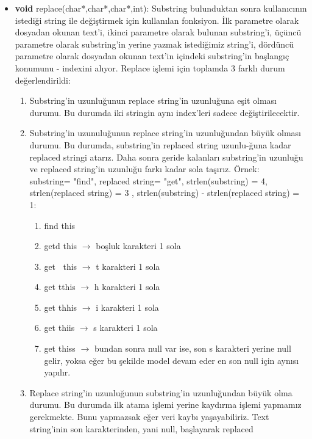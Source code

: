\documentclass[11pt]{article}
\begin{document}
\begin{itemize}
    \item \textbf{void} \textsf{replace(char*,char*,char*,int):}
    Substring bulunduktan sonra kullanıcının istediği string ile değiştirmek 
    için kullanılan fonksiyon. İlk parametre olarak dosyadan okunan text'i,
    ikinci parametre olarak bulunan substring'i, üçüncü parametre olarak 
    substring'in yerine yazmak istediğimiz string'i, dördüncü parametre 
    olarak dosyadan okunan text'in içindeki substring'in başlangıç konumunu
    - indexini alıyor. Replace işlemi için toplamda 3 farklı durum 
    değerlendirildi:
    \begin{enumerate}
    	\item Substring'in uzunluğunun replace string'in uzunluğuna eşit
    	olması durumu. Bu durumda iki stringin aynı index'leri sadece 
    	değiştirilecektir.
    	\item Substring'in uzunuluğunun replace string'in uzunluğundan
    	büyük olması durumu. Bu durumda, substring'in replaced string 
    	uzunlu-ğuna kadar replaced stringi atarız. Daha sonra geride    				kalanları substring'in uzunluğu ve replaced string'in uzunluğu farkı  		kadar sola taşırız. Örnek:\\ substring= "find", replaced string= 				"get", strlen(substring) = 4, strlen(replaced string) = 3 ,
    	strlen(substring) - strlen(replaced string) = 1:
    	\begin{enumerate}
    	    \item find this
    		\item getd this $\rightarrow$ boşluk karakteri 1 sola
    		\item get $\; \;$this $\rightarrow$ t karakteri 1 sola
    		\item get tthis $\rightarrow$ h karakteri 1 sola
    		\item get thhis $\rightarrow$ i karakteri 1 sola
    		\item get thiis $\rightarrow$ s karakteri 1 sola
    		\item get thiss $\rightarrow$ bundan sonra null var ise, son s 
    		karakteri yerine null gelir, yoksa eğer bu şekilde model devam
    		eder en son null için aynısı yapılır.
    	\end{enumerate}
    	\item Replace string'in uzunluğunun substring'in uzunluğundan büyük 
    	olma durumu. Bu durumda ilk atama işlemi yerine kaydırma işlemi 
    	yapmamız gerekmekte. Bunu yapmazsak eğer veri kaybı yaşayabiliriz.
    	Text string'inin son karakterinden, yani null, başlayarak replaced

\end{enumerate}
\end{itemize}
\end{document}
